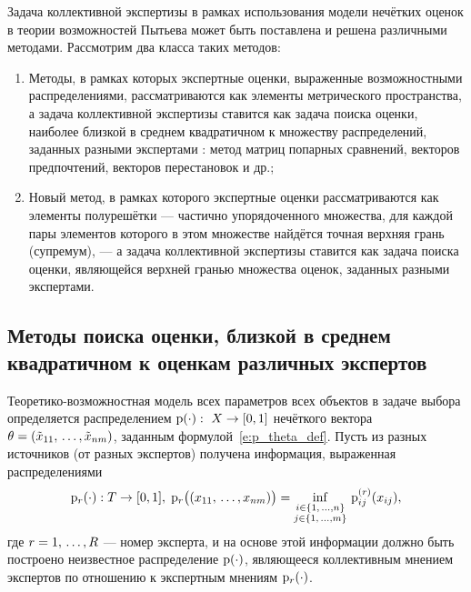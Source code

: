 Задача коллективной экспертизы в рамках использования модели нечётких оценок в теории возможностей Пытьева может быть поставлена и решена различными методами. Рассмотрим два класса таких методов:
	\begin{enumerate}
		\item Методы, в рамках которых экспертные оценки, выраженные возможностными распределениями, рассматриваются как элементы метрического пространства, а задача коллективной экспертизы ставится как задача поиска оценки, наиболее близкой в среднем квадратичном к множеству распределений, заданных разными экспертами  \cite{pytyev_experts}: метод матриц попарных сравнений, векторов предпочтений, векторов перестановок и др.;
		\item Новый метод, в рамках которого экспертные оценки рассматриваются как элементы полурешётки 
		--- частично упорядоченного множества, для каждой пары элементов которого в этом множестве найдётся точная верхняя  грань (супремум), --- %
		а задача коллективной экспертизы ставится как задача поиска оценки, являющейся верхней гранью множества оценок, заданных разными экспертами.
	\end{enumerate} 
	

\subsection{Методы поиска оценки, близкой в среднем квадратичном к оценкам различных экспертов}
\label{easy_collective_matrix_vector}

Теоретико-возможностная модель всех параметров всех объектов в задаче выбора определяется распределением ${\mathrm{p}}(\cdot):\ X\to[0,1]$ нечёткого вектора $\theta = (\tilde x_{11}, \, \ldots, \tilde x_{nm})$, заданным формулой~\ref{e:p_theta_def}. Пусть из разных источников (от разных экспертов) получена информация, выраженная распределениями 
\begin{equation}
\label{pr_theta_def}
	{\mathrm{p}}_r(\cdot): T \rightarrow [0,1],\; {\mathrm{p}}_r \big((x_{11}, \, \ldots, x_{nm})\big) =  \inf_{\substack{i \in \{1,\, \ldots, n\} \\ j \in \{1,\, \ldots, m\}}}\,{\mathrm{p}}^{(r)}_{ij}(x_{ij}), 
\end{equation}
где $r = 1,\, \ldots, R$ --- номер эксперта, и на основе этой информации должно быть построено неизвестное распределение ${\mathrm{p}}(\cdot)$, являющееся коллективным мнением экспертов по отношению к экспертным мнениям ${\mathrm{p}}_r(\cdot)$. 


